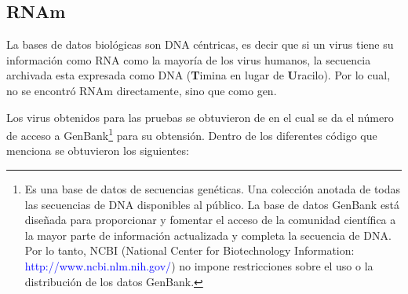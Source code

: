\documentclass[12pt,a4paper,spanish]{article}
\begin{document}
	\subsection{RNAm}
		\par La bases de datos biológicas son DNA céntricas, es decir que si un virus tiene su información como RNA como 			la mayoría de los virus humanos, la secuencia archivada esta expresada como DNA (\textbf{T}imina en lugar de 			\textbf{U}racilo). Por lo cual, no se encontró RNAm directamente, sino que como gen.

		\par Los virus obtenidos para las pruebas se obtuvieron de \cite{holmes} en el cual se da el número de acceso a 		GenBank\footnote{Es una base de datos de secuencias genéticas. Una colección anotada de todas las secuencias de 		DNA disponibles al público. La base de datos GenBank está diseñada para proporcionar y fomentar el acceso de la 		comunidad científica a la mayor parte de información actualizada y completa la secuencia de DNA. Por lo tanto, 			NCBI (National Center for Biotechnology Information: \textcolor{blue}{http://www.ncbi.nlm.nih.gov/}) no impone 			restricciones sobre el uso o la distribución de los datos GenBank.} para su obtensión. Dentro de los diferentes 		código que menciona \cite{holmes} se obtuvieron los siguientes:
\end{document}

